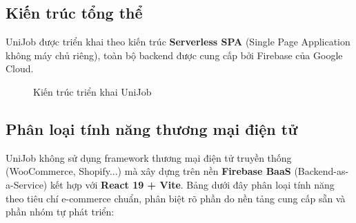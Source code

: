 
\subsection{Kiến trúc tổng thể}

UniJob được triển khai theo kiến trúc \textbf{Serverless SPA} (Single Page Application không
máy chủ riêng), toàn bộ backend được cung cấp bởi Firebase của Google Cloud.

\begin{figure}[H]
\centering
{}
\caption{Kiến trúc triển khai UniJob}
\end{figure}

\subsection{Phân loại tính năng thương mại điện tử}

UniJob không sử dụng framework thương mại điện tử truyền thống (WooCommerce, Shopify...)
mà xây dựng trên nền \textbf{Firebase BaaS} (Backend-as-a-Service) kết hợp với
\textbf{React 19 + Vite}. Bảng dưới đây phân loại tính năng theo tiêu chí e-commerce chuẩn,
phân biệt rõ phần do nền tảng cung cấp sẵn và phần nhóm tự phát triển:


